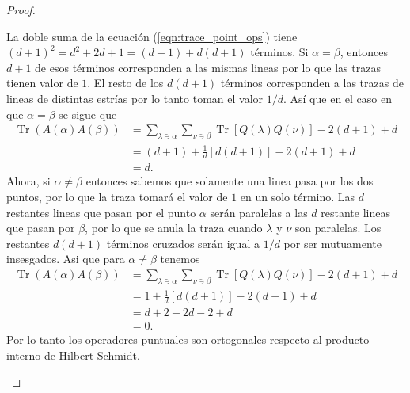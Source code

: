 \documentclass[a4paper]{report}
\DeclareMathOperator{\Tr}{Tr}
\begin{document}
\begin{proof}
\begin{enumerate}
        La doble suma de la ecuación
        (\ref{eqn:trace_point_ops}) tiene $(d+1)^2 = d^2 +
        2d + 1 = (d+1) + d(d+1)$ términos. Si $\alpha =
        \beta$, entonces $d+1$ de esos términos corresponden
        a las mismas lineas por lo que las trazas tienen
        valor de $1$. El resto de los $d(d+1)$ términos
        corresponden a las trazas de lineas de distintas
        estrías por lo tanto toman el valor $1 / d$. Así que
        en el caso en que $\alpha = \beta$ se sigue que
        \begin{align}
          \Tr\left( A(\alpha)A(\beta) \right) 
          &= \sum_{\lambda \ni \alpha}^{} 
          \sum_{\nu \ni \beta}^{}
          \Tr\left[Q(\lambda)Q(\nu)\right]
          - 2(d+1) + d \\
          &= (d+1) + \frac{1}{d}[d(d+1)] - 2(d+1) + d \\
          &= d.
        \end{align}
        Ahora, si $\alpha \neq \beta$ entonces sabemos que
        solamente una linea pasa por los dos puntos, por lo
        que la traza tomará el valor de $1$ en un solo
        término. Las $d$ restantes lineas que pasan por el
        punto $\alpha$ serán paralelas a las $d$ restante
        lineas que pasan por $\beta$, por lo que se anula la
        traza cuando $\lambda$ y $\nu$ son paralelas. Los 
        restantes $d(d+1)$ términos cruzados serán igual a
        $1 / d$ por ser mutuamente insesgados. Asi que para
        $\alpha \neq \beta$ tenemos
        \begin{align}
          \Tr\left( A(\alpha)A(\beta) \right) 
          &=  \sum_{\lambda \ni \alpha}^{} 
          \sum_{\nu \ni \beta}^{}
          \Tr\left[Q(\lambda)Q(\nu)\right]
          - 2(d+1) + d \\
          &= 1 + \frac{1}{d} [d(d+1)] - 2(d+1) + d \\
          &= d + 2 - 2d - 2 + d \\
          &= 0.
        \end{align}
        Por lo tanto los operadores puntuales son
        ortogonales respecto al producto interno de
        Hilbert-Schmidt.
    \end{enumerate}
  \end{proof}
\end{document}
